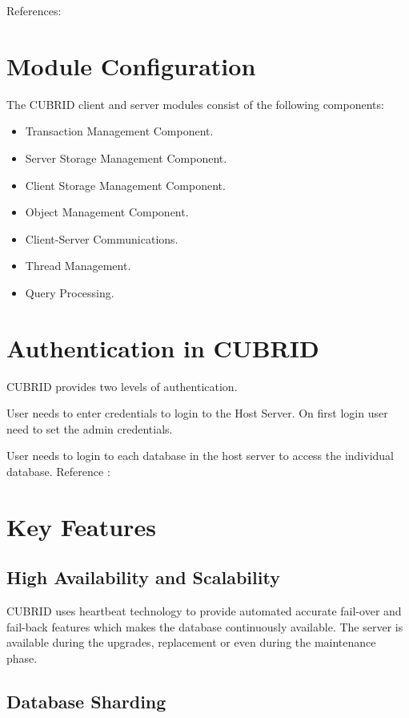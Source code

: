 \documentclass[9pt,twocolumn,twoside]{styles/osajnl}
\begin{document}
References: \cite{www-cubrid.org}
\newpage

\section{Module Configuration}

The CUBRID client and server modules consist of the following components:

\begin{itemize}
\item Transaction Management Component.
\item Server Storage Management Component.
\item Client Storage Management Component.
\item Object Management Component.
\item Client-Server Communications.
\item Thread Management.
\item Query Processing.
\end{itemize}

\section{Authentication in CUBRID}


CUBRID provides two levels of authentication.

User needs to enter credentials to login to the Host Server. On first
login user need to set the admin credentials.

User needs to login to each database in the host server to access the
individual database.
Reference : \cite{www-authentication}


\section{Key Features}

\subsection{High Availability and Scalability}

CUBRID uses heartbeat technology to
provide automated accurate fail-over and fail-back features which
makes the database continuously available. The server is available
during the upgrades, replacement or even during the maintenance phase.

\subsection{Database Sharding}
\end{document}
